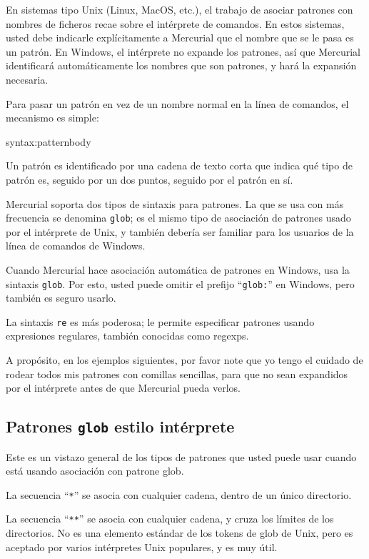 En sistemas tipo Unix (Linux, MacOS, etc.), el trabajo de asociar
patrones con nombres de ficheros recae sobre el intérprete de comandos.
En estos sistemas, usted debe indicarle explícitamente a Mercurial que
el nombre que se le pasa es un patrón. En Windows, el intérprete no
expande los patrones, así que Mercurial identificará automáticamente
los nombres que son patrones, y hará la expansión necesaria.

Para pasar un patrón en vez de un nombre normal en la línea de
comandos, el mecanismo es simple:
\begin{codesample2}
  syntax:patternbody
\end{codesample2}
Un patrón es identificado por una cadena de texto corta que indica qué
tipo de patrón es, seguido por un dos puntos, seguido por el patrón en
sí.

Mercurial soporta dos tipos de sintaxis para patrones. La que se usa
con más frecuencia  se denomina \texttt{glob}; es el mismo tipo de asociación de patrones usado por
el intérprete de Unix, y también debería ser familiar para los
usuarios de la línea de comandos de Windows.

Cuando Mercurial hace asociación automática de patrones en Windows,
usa la sintaxis \texttt{glob}.  Por esto, usted puede omitir el
prefijo ``\texttt{glob:}'' en Windows, pero también es seguro usarlo.

La sintaxis \texttt{re} es más poderosa;
le permite especificar patrones usando expresiones regulares, también
conocidas como regexps.

A propósito, en los ejemplos siguientes, por favor note que yo tengo
el cuidado de rodear todos mis patrones con comillas sencillas, para
que no sean expandidos por el intérprete antes de que Mercurial pueda
verlos.

\subsection{Patrones \texttt{glob} estilo intérprete}

Este es un vistazo general de los tipos de patrones que usted puede
usar cuando está usando asociación con patrone glob.

La secuencia ``\texttt{*}'' se asocia con cualquier cadena, dentro de
un único directorio.

La secuencia ``\texttt{**}'' se asocia con cualquier cadena, y cruza los
límites de los directorios. No es una elemento estándar de los tokens
de glob de Unix, pero es aceptado por varios intérpretes Unix
populares, y es muy útil.

